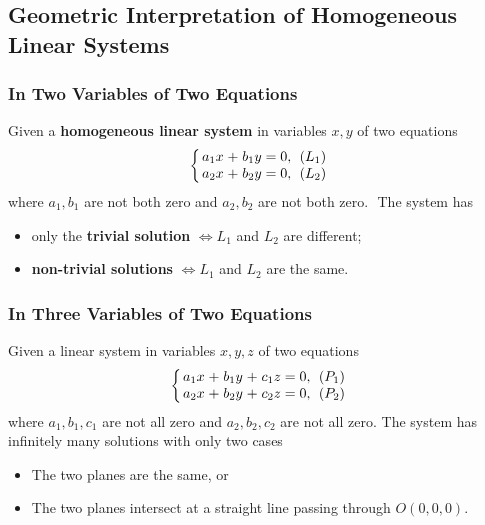 \documentclass[../ma2001_notes.tex]{subfiles}
\begin{document}
\subsection{Geometric Interpretation of Homogeneous Linear Systems}
\subsubsection{In Two Variables of Two Equations}
Given a \textbf{homogeneous linear system} in variables \(x, y\) of two equations
\[\left\{
\arraycolsep=1.4pt
\begin{array}{cccccc}
	a_1x & + & b_1y & = & 0, & \ (L_1) \\
	a_2x & + & b_2y & = & 0, & \ (L_2)
\end{array}\right.\]
where \(a_1, b_1\) are not both zero and \(a_2, b_2\) are not both zero. \(\) The system has
\begin{itemize}
	\item only the \textbf{trivial solution} \(\iff L_1\) and \(L_2\) are different;
	\item \textbf{non-trivial solutions} \(\iff L_1\) and \(L_2\) are the same.
\end{itemize}

\subsubsection{In Three Variables of Two Equations}
Given a linear system in variables \(x, y, z\) of two equations
\[\left\{
\arraycolsep=1.4pt
\begin{array}{cccccccc}
	a_1x & + & b_1y & + & c_1z & = & 0, & \ (P_1) \\
	a_2x & + & b_2y & + & c_2z & = & 0, & \ (P_2)
\end{array}\right.\]
where \(a_1, b_1, c_1\) are not all zero and \(a_2, b_2, c_2\) are not all zero. The system has infinitely many solutions with only two cases
\begin{itemize}
	\item The two planes are the same, or
	\item The two planes intersect at a straight line passing through \(O(0,0,0)\).
\end{itemize}
\end{document}
